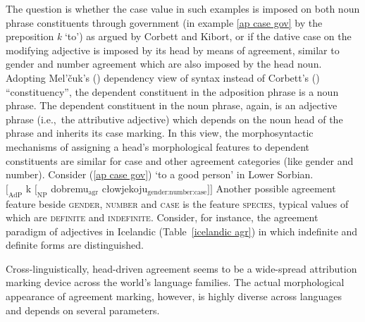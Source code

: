 The question is whether the case value in such examples is imposed on both noun phrase constituents through government (in example \ref{ap case gov} by the preposition \textit{k} ‘to’) as argued by Corbett and Kibort, or if the dative case on the modifying adjective is imposed by its head by means of agreement, similar to gender and number agreement which are also imposed by the head noun. Adopting Mel'čuk's (\citeyear[329, 337]{melcuk1993}) dependency view of syntax instead of Corbett's (\citeyear[133]{corbett2006}) “constituency”, the dependent constituent in the adposition phrase is a noun phrase. The dependent constituent in the noun phrase, again, is an adjective phrase (i.e.,~the attributive adjective) which depends on the noun head of the phrase and inherits its case marking. In this view, the morphosyntactic mechanisms of assigning a head's morphological features to dependent constituents are similar for case and other agreement categories (like gender and number). Consider (\ref{ap case gov}) ‘to a good person’ in Lower Sorbian.
\ea
{}\\
$[_\textrm{AdP}$ k $[_\textrm{NP}$ dobremu$_\textrm{agr}$ cłowjekoju$_\textrm{gender:number:case} ] ]$
\z
Another possible agreement feature beside \textsc{gender, number} and \textsc{case} is the feature \textsc{species}, typical values of which are \textsc{definite} and \textsc{indefinite}. Consider, for instance, the agreement paradigm of adjectives in Icelandic (Table~\ref{icelandic agr}) in which indefinite and definite forms are distinguished.

Cross-linguistically, head\hyp{}driven agreement seems to be a wide-spread attribution marking device across the world's language families. The actual morphological appearance of agreement marking, however, is highly diverse across languages and depends on several parameters.

